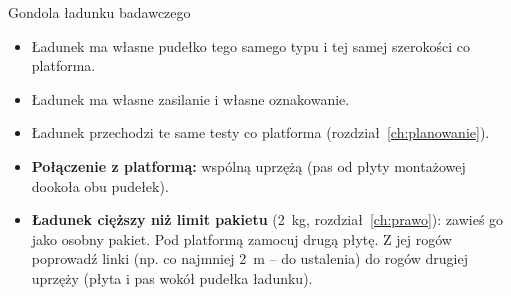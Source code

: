\begin{sekcja}{Gondola ładunku badawczego}
\begin{itemize}
  \item Ładunek ma własne pudełko tego samego typu i tej samej szerokości co platforma.
  \item Ładunek ma własne zasilanie i własne oznakowanie.
  \item Ładunek przechodzi te same testy co platforma (rozdział~\ref{ch:planowanie}).
  \item \textbf{Połączenie z platformą:} wspólną uprzężą (pas od płyty montażowej dookoła obu pudełek).
  \item \textbf{Ładunek cięższy niż limit pakietu} (\SI{2}{kg}, rozdział~\ref{ch:prawo}): zawieś go jako osobny pakiet. Pod platformą zamocuj drugą płytę. Z jej rogów poprowadź linki (np. co najmniej \SI{2}{m} -- do ustalenia) do rogów drugiej uprzęży (płyta i pas wokół pudełka ładunku).
\end{itemize}

\begin{center}\resizebox{0.7\linewidth}{!}{\rysCiezkiLadunek}\end{center}
\end{sekcja}
